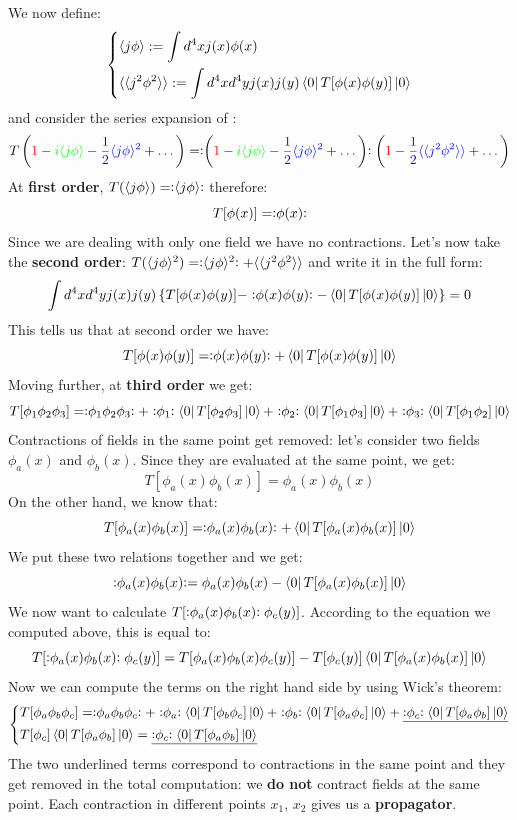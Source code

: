 \documentclass[../main.tex]{subfiles}
\begin{document}
We now define:
\[
\left\{
\begin{aligned}
&\langle j\phi \rangle:=\int d^4xj(x)\phi(x)\\
&\langle\langle j^2\phi^2 \rangle\rangle:=\int d^4xd^4yj(x)j(y)\bra{0}T[\phi(x)\phi(y)]\ket{0}
\end{aligned}
\right.
\]
and consider the series expansion of :
\[
T\left({\color{red}1}-{\color{green}i\langle j\phi \rangle}-{\color{blue}\frac{1}{2}\langle j\phi\rangle^2}+\dots\right)=\vcentcolon\mathrel{\left({\color{red}1}-{\color{green}i\langle j\phi \rangle}-{\color{blue}\frac{1}{2}\langle j\phi\rangle^2}+\dots\right)}\vcentcolon\left({\color{red}1}-{\color{blue}\frac{1}{2}\langle\langle j^2\phi^2 \rangle\rangle}+\dots\right)
\]
At \textbf{first order}, $T(\langle j\phi \rangle)=\vcentcolon\mathrel{\langle j\phi\rangle}\vcentcolon$ therefore:
\[
T[\phi(x)]=\vcentcolon\mathrel{\phi(x)}\vcentcolon
\]
Since we are dealing with only one field we have no contractions. Let's now take the \textbf{second order}: $T(\langle j\phi \rangle^2)=\vcentcolon\mathrel{\langle j\phi \rangle^2}\vcentcolon+\langle\langle j^2\phi^2 \rangle\rangle$ and write it in the full form:
\[
\int d^4xd^4yj(x)j(y)\left\{T[\phi(x)\phi(y)]-\vcentcolon\mathrel{\phi(x)\phi(y)}\vcentcolon-\bra{0}T[\phi(x)\phi(y)]\ket{0}\right\}=0
\]
This tells us that at second order we have:
\[
T[\phi(x)\phi(y)]=\vcentcolon\mathrel{\phi(x)\phi(y)}\vcentcolon+\bra{0}T[\phi(x)\phi(y)]\ket{0}
\]
Moving further, at \textbf{third order} we get:
\[
T[\phi_1\phi_2\phi_3]=\vcentcolon\mathrel{\phi_1\phi_2\phi_3}\vcentcolon+\vcentcolon\mathrel{\phi_1}\vcentcolon\bra{0}T[\phi_2\phi_3]\ket{0}+\vcentcolon\mathrel{\phi_2}\vcentcolon\bra{0}T[\phi_1\phi_3]\ket{0}+\vcentcolon\mathrel{\phi_3}\vcentcolon\bra{0}T[\phi_1\phi_2]\ket{0}
\]
Contractions of fields in the same point get removed: let's consider two fields $\phi_a(x)$ and $\phi_b(x)$. Since they are evaluated at the same point, we get:
\[
T[\phi_a(x)\phi_b(x)]=\phi_a(x)\phi_b(x)
\]
On the other hand, we know that:
\[
T[\phi_a(x)\phi_b(x)]=\vcentcolon\mathrel{\phi_a(x)\phi_b(x)}\vcentcolon+\bra{0}T[\phi_a(x)\phi_b(x)]\ket{0}
\]
We put these two relations together and we get:
\[
\vcentcolon\mathrel{\phi_a(x)\phi_b(x)}\vcentcolon=\phi_a(x)\phi_b(x)-\bra{0}T[\phi_a(x)\phi_b(x)]\ket{0}
\]
We now want to calculate $T[\vcentcolon\mathrel{\phi_a(x)\phi_b(x)}\vcentcolon\phi_c(y)]$. According to the equation we computed above, this is equal to:
\[
T[\vcentcolon\mathrel{\phi_a(x)\phi_b(x)}\vcentcolon\phi_c(y)]=T[\phi_a(x)\phi_b(x)\phi_c(y)]-T[\phi_c(y)]\bra{0}T[\phi_a(x)\phi_b(x)]\ket{0}
\]
Now we can compute the terms on the right hand side by using Wick's theorem:
\[
\left\{
\begin{aligned}
&T[\phi_a\phi_b\phi_c]=\vcentcolon\mathrel{\phi_a\phi_b\phi_c}\vcentcolon+\vcentcolon\mathrel{\phi_a}\vcentcolon\bra{0}T[\phi_b\phi_c]\ket{0}+\vcentcolon\mathrel{\phi_b}\vcentcolon\bra{0}T[\phi_a\phi_c]\ket{0}+\underline{\vcentcolon\mathrel{\phi_c}\vcentcolon\bra{0}T[\phi_a\phi_b]\ket{0}}\\
&T[\phi_c]\bra{0}T[\phi_a\phi_b]\ket{0}=\underline{\vcentcolon\mathrel{\phi_c}\vcentcolon\bra{0}T[\phi_a\phi_b]\ket{0}}
\end{aligned}
\right.
\]
The two underlined terms correspond to contractions in the same point and they get removed in the total computation: we \textbf{do not} contract fields at the same point. Each contraction in different points $x_1$, $x_2$ gives us a \textbf{propagator}.
\end{document}
